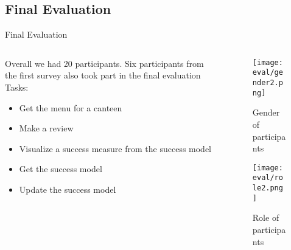 \subsection{Final Evaluation}
\begin{frame}{Final Evaluation}
  \begin{columns}
    \begin{column}[]{.5\textwidth}
      Overall we had 20 participants. Six participants from the first survey also took part in the final evaluation\\
      Tasks:
      \begin{itemize}
        \item Get the menu for a canteen
        \item Make a review
        \item Visualize a success measure from the success model
        \item Get the success model
        \item Update the success model
      \end{itemize}
      \ \\
      
    \end{column}
    \begin{column}[]{.35\textwidth}
      \begin{figure}
        \captionsetup{justification=raggedright}
        \caption{Gender of participants}
        \texttt{[image: eval/gender2.png]}
       
      \end{figure}
      \begin{figure}
        \captionsetup{justification=raggedright}
        \caption{Role of participants}
        \texttt{[image: eval/role2.png]}
        
      \end{figure}
    \end{column}
  \end{columns}
  
\end{frame}

